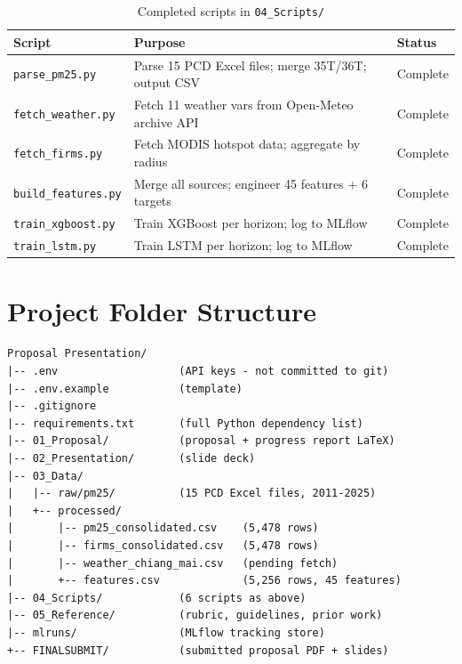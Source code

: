 \documentclass[12pt,a4paper]{report}
\begin{document}
\begin{table}[H]
\centering
\caption{Completed scripts in \texttt{04\_Scripts/}}
\label{tab:scripts}
\begin{tabularx}{\textwidth}{@{}p{4.5cm}Xp{2.5cm}@{}}
\toprule
\textbf{Script} & \textbf{Purpose} & \textbf{Status} \\
\midrule
\texttt{parse\_pm25.py}       & Parse 15 PCD Excel files; merge 35T/36T; output CSV & Complete \\
\texttt{fetch\_weather.py}    & Fetch 11 weather vars from Open-Meteo archive API   & Complete \\
\texttt{fetch\_firms.py}      & Fetch MODIS hotspot data; aggregate by radius        & Complete \\
\texttt{build\_features.py}   & Merge all sources; engineer 45 features + 6 targets & Complete \\
\texttt{train\_xgboost.py}    & Train XGBoost per horizon; log to MLflow            & Complete \\
\texttt{train\_lstm.py}       & Train LSTM per horizon; log to MLflow                & Complete \\
\bottomrule
\end{tabularx}
\end{table}

\section{Project Folder Structure}

\begin{lstlisting}[language={}]
Proposal Presentation/
|-- .env                   (API keys - not committed to git)
|-- .env.example           (template)
|-- .gitignore
|-- requirements.txt       (full Python dependency list)
|-- 01_Proposal/           (proposal + progress report LaTeX)
|-- 02_Presentation/       (slide deck)
|-- 03_Data/
|   |-- raw/pm25/          (15 PCD Excel files, 2011-2025)
|   +-- processed/
|       |-- pm25_consolidated.csv    (5,478 rows)
|       |-- firms_consolidated.csv   (5,478 rows)
|       |-- weather_chiang_mai.csv   (pending fetch)
|       +-- features.csv             (5,256 rows, 45 features)
|-- 04_Scripts/            (6 scripts as above)
|-- 05_Reference/          (rubric, guidelines, prior work)
|-- mlruns/                (MLflow tracking store)
+-- FINALSUBMIT/           (submitted proposal PDF + slides)
\end{lstlisting}

\end{document}
